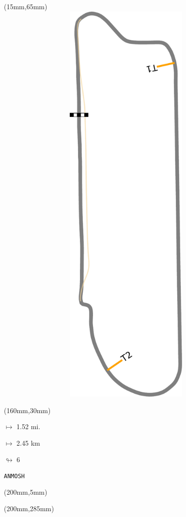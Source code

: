 \begin{textblock*}{185mm}(15mm,65mm)%
\centering
\mbox{\includegraphics[width=185mm,height=210mm,keepaspectratio]{PT/ANMOSH.pdf}}
\end{textblock*}
\begin{textblock*}{40mm}(160mm,30mm)%
\Large
\par$\mapsto$ 1.52 mi.
\par$\mapsto$ 2.45 km
\par$\looparrowright$ 6
\par\hfill\tiny\tt ANMOSH\\
\end{textblock*}
\begin{textblock*}{20mm}(200mm,5mm)%
\fbox{\thepage}
\label{ANMOSH}
\end{textblock*}
\begin{textblock*}{20mm}(200mm,285mm)%
\fbox{\thepage}
\end{textblock*}

